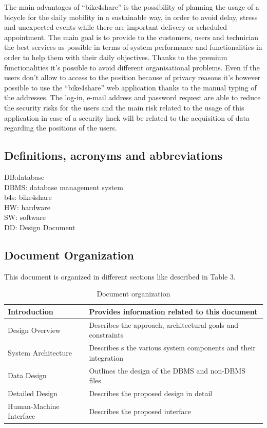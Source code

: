 \documentclass{article}
\begin{document}
The main advantages of “bike4share” is the possibility of planning the usage of a bicycle for the daily mobility in a sustainable way, in order to avoid delay, stress and unexpected events while there are important delivery or scheduled appointment.
The main goal is to provide to the customers, users and technician the best services as possible in terms of system performance and functionalities in order to help them with their daily objectives.
Thanks to the premium functionalities it’s possible to avoid different organisational problems. 
Even if the users don’t allow to access to the position because of privacy reasons it’s however possible to use the “bike4share” web application thanks to the manual typing of the addresses.  
The log-in, e-mail address and password request are able to reduce the security risks for the users and the main risk related to the usage of this application in case of a security hack will be related to the acquisition of data regarding the positions of the users.
\subsection{Definitions, acronyms and abbreviations}
DB:database\\
DBMS: database management system\\
b4s: bike4share\\
HW: hardware\\
SW: software\\
DD: Design Document
\subsection{Document Organization}
This document is organized in different sections like described in Table 3.

\begin{table} [H]
    \begin{center}
        \begin{tabular}{|l|p{}|}
            \hline
            Introduction &   Provides information related to this document         \\ 
            \hline
            Design Overview &  
            Describes the approach, architectural goals and constraints \\
            \hline
            System Architecture &  
            Describes s the various system components and their integration \\
            \hline
            Data Design & Outlines the design of the DBMS and non-DBMS files \\
            \hline
            Detailed Design & Describes the proposed design in detail 
            \\
            \hline
             Human-Machine Interface & Describes the proposed interface
            \\
            \hline
        \end{tabular}
    \end{center}
\caption{Document organization}
\end{table}
\newpage
\end{document}

